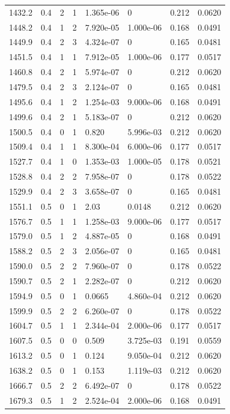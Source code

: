 \documentclass[preview]{standalone}
\begin{document}
{{{\begin{tabular}{L{1.2cm}C{1.2cm} C{0.3cm}C{0.5cm} C{1.4cm}C{1.4cm} C{1.4cm}C{1.4cm}}
  1432.2  &   0.4  & 2     &  1 &  1.365e-06  & 0  & 0.212 &  0.0620   \\ 
  1448.2  &   0.4  & 1     &  2 &  7.920e-05  & 1.000e-06  & 0.168 &  0.0491   \\ 
  1449.9  &   0.4  & 2     &  3 &  4.324e-07  & 0  & 0.165 &  0.0481   \\ 
  1451.5  &   0.4  & 1     &  1 &  7.912e-05  & 1.000e-06  & 0.177 &  0.0517   \\ 
  1460.8  &   0.4  & 2     &  1 &  5.974e-07  & 0  & 0.212 &  0.0620   \\ 
  1479.5  &   0.4  & 2     &  3 &  2.124e-07  & 0  & 0.165 &  0.0481   \\ 
  1495.6  &   0.4  & 1     &  2 &  1.254e-03  & 9.000e-06  & 0.168 &  0.0491   \\ 
  1499.6  &   0.4  & 2     &  1 &  5.183e-07  & 0  & 0.212 &  0.0620   \\ 
  1500.5  &   0.4  & 0     &  1 &  0.820  & 5.996e-03  & 0.212 &  0.0620   \\ 
  1509.4  &   0.4  & 1     &  1 &  8.300e-04  & 6.000e-06  & 0.177 &  0.0517   \\ 
  1527.7  &   0.4  & 1     &  0 &  1.353e-03  & 1.000e-05  & 0.178 &  0.0521   \\ 
  1528.8  &   0.4  & 2     &  2 &  7.958e-07  & 0  & 0.178 &  0.0522   \\ 
  1529.9  &   0.4  & 2     &  3 &  3.658e-07  & 0  & 0.165 &  0.0481   \\ 
  1551.1  &   0.5  & 0     &  1 &  2.03  & 0.0148  & 0.212 &  0.0620   \\ 
  1576.7  &   0.5  & 1     &  1 &  1.258e-03  & 9.000e-06  & 0.177 &  0.0517   \\ 
  1579.0  &   0.5  & 1     &  2 &  4.887e-05  & 0  & 0.168 &  0.0491   \\ 
  1588.2  &   0.5  & 2     &  3 &  2.056e-07  & 0  & 0.165 &  0.0481   \\ 
  1590.0  &   0.5  & 2     &  2 &  7.960e-07  & 0  & 0.178 &  0.0522   \\ 
  1590.7  &   0.5  & 2     &  1 &  2.282e-07  & 0  & 0.212 &  0.0620   \\ 
  1594.9  &   0.5  & 0     &  1 &  0.0665  & 4.860e-04  & 0.212 &  0.0620   \\ 
  1599.9  &   0.5  & 2     &  2 &  6.260e-07  & 0  & 0.178 &  0.0522   \\ 
  1604.7  &   0.5  & 1     &  1 &  2.344e-04  & 2.000e-06  & 0.177 &  0.0517   \\ 
  1607.5  &   0.5  & 0     &  0 &  0.509  & 3.725e-03  & 0.191 &  0.0559   \\ 
  1613.2  &   0.5  & 0     &  1 &  0.124  & 9.050e-04  & 0.212 &  0.0620   \\ 
  1638.2  &   0.5  & 0     &  1 &  0.153  & 1.119e-03  & 0.212 &  0.0620   \\ 
  1666.7  &   0.5  & 2     &  2 &  6.492e-07  & 0  & 0.178 &  0.0522   \\ 
  1679.3  &   0.5  & 1     &  2 &  2.524e-04  & 2.000e-06  & 0.168 &  0.0491   \\ 
\hline 
\end{tabular} 

}}}
\end{document}
